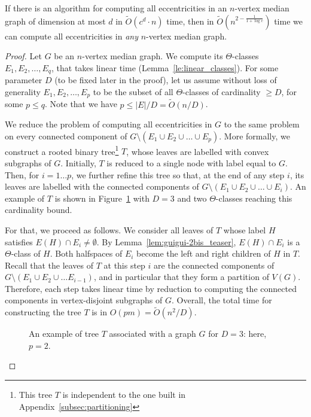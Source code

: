 \documentclass[a4paper,UKenglish,numberwithinsect,cleveref, autoref]{lipics-v2021}
\newcommand{\card}[1]{\left| #1 \right|}
\begin{document}
\begin{lemma}\label{lem:guigui-4}
If there is an algorithm for computing all eccentricities in an $n$-vertex median graph of dimension at most $d$ in $\tilde{O}(c^d \cdot n)$ time, then in $\tilde{O}(n^{2 - \frac 1 {1+\log{c}}})$ time we can compute all eccentricities in {\em any} $n$-vertex median graph.
\end{lemma}
\begin{proof}
Let $G$ be an $n$-vertex median graph.
We compute its $\Theta$-classes $E_1,E_2,\ldots,E_q$, that takes linear time (Lemma~\ref{le:linear_classes}).
For some parameter $D$ (to be fixed later in the proof), let us assume without loss of generality $E_1,E_2,\ldots,E_p$ to be the subset of all $\Theta$-classes of cardinality $\geq D$, for some $p \leq q$. Note that we have $p \leq \card{E}/D = \tilde{O}(n/D)$.

We reduce the problem of computing all eccentricities in $G$ to the same problem on every connected component of $G \setminus (E_1 \cup E_2 \cup \ldots \cup E_p)$. 
More formally, we construct a rooted binary tree\footnote{This tree $T$ is independent to the one built in Appendix~\ref{subsec:partitioning}} $T$, whose leaves are labelled with convex subgraphs of $G$.
Initially, $T$ is reduced to a single node with label equal to $G$.
Then, for $i = 1 \ldots p$, we further refine this tree so that, at the end of any step $i$, its leaves are labelled with the connected components of $G \setminus \left(E_1 \cup E_2 \cup \ldots \cup E_i\right)$. An example of $T$ is shown in Figure~\ref{fig:reduction} with $D=3$ and two $\Theta$-classes reaching this cardinality bound.

For that, we proceed as follows.
We consider all leaves of $T$ whose label $H$ satisfies $E(H) \cap E_i \neq \emptyset$.
By Lemma~\ref{lem:guigui-2bis_teaser}, $E(H) \cap E_i$ is a $\Theta$-class of $H$.
Both halfspaces of $E_i$ become the left and right children of $H$ in $T$. 
Recall that the leaves of $T$ at this step $i$ are the connected components of $G \setminus (E_1 \cup E_2 \cup \ldots E_{i-1})$, and in particular that they form a partition of $V(G)$.
Therefore, each step takes linear time by reduction to computing the connected components in vertex-disjoint subgraphs of $G$.
Overall, the total time for constructing the tree $T$ is in ${O}(pm) = \tilde{O}(n^2/D)$.

\begin{figure}[h]
\centering
\scalebox{0.6}{}
\caption{An example of tree $T$ associated with a graph $G$ for $D=3$: here, $p=2$.}
\label{fig:reduction}
\end{figure}


\end{proof}
\end{document}

